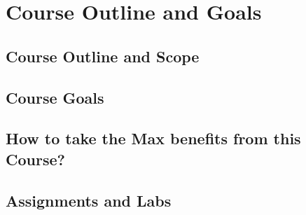 \section{Course Outline and Goals}

\subsection{Course Outline and Scope}

\subsection{Course Goals}

\subsection{How to take the Max benefits from this Course?}

\subsection{Assignments and Labs}

%

%
%

